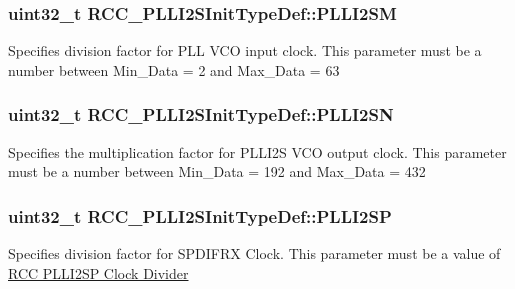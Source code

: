 \subsubsection[{\texorpdfstring{P\+L\+L\+I2\+SM}{PLLI2SM}}]{\setlength{\rightskip}{0pt plus 5cm}uint32\+\_\+t R\+C\+C\+\_\+\+P\+L\+L\+I2\+S\+Init\+Type\+Def\+::\+P\+L\+L\+I2\+SM}\hypertarget{struct_r_c_c___p_l_l_i2_s_init_type_def_ab220aca5b6209623b23f0e4216d7fc6d}{}\label{struct_r_c_c___p_l_l_i2_s_init_type_def_ab220aca5b6209623b23f0e4216d7fc6d}
Specifies division factor for P\+LL V\+CO input clock. This parameter must be a number between Min\+\_\+\+Data = 2 and Max\+\_\+\+Data = 63 
\subsubsection[{\texorpdfstring{P\+L\+L\+I2\+SN}{PLLI2SN}}]{\setlength{\rightskip}{0pt plus 5cm}uint32\+\_\+t R\+C\+C\+\_\+\+P\+L\+L\+I2\+S\+Init\+Type\+Def\+::\+P\+L\+L\+I2\+SN}\hypertarget{struct_r_c_c___p_l_l_i2_s_init_type_def_a1edb776fccb621edb1405b3502ebc8eb}{}\label{struct_r_c_c___p_l_l_i2_s_init_type_def_a1edb776fccb621edb1405b3502ebc8eb}
Specifies the multiplication factor for P\+L\+L\+I2S V\+CO output clock. This parameter must be a number between Min\+\_\+\+Data = 192 and Max\+\_\+\+Data = 432 
\subsubsection[{\texorpdfstring{P\+L\+L\+I2\+SP}{PLLI2SP}}]{\setlength{\rightskip}{0pt plus 5cm}uint32\+\_\+t R\+C\+C\+\_\+\+P\+L\+L\+I2\+S\+Init\+Type\+Def\+::\+P\+L\+L\+I2\+SP}\hypertarget{struct_r_c_c___p_l_l_i2_s_init_type_def_a74f0f0ff8f1a603a598776745e384f5f}{}\label{struct_r_c_c___p_l_l_i2_s_init_type_def_a74f0f0ff8f1a603a598776745e384f5f}
Specifies division factor for S\+P\+D\+I\+F\+RX Clock. This parameter must be a value of \hyperlink{group___r_c_c_ex___p_l_l_i2_s_p___clock___divider}{R\+CC P\+L\+L\+I2\+SP Clock Divider} 
